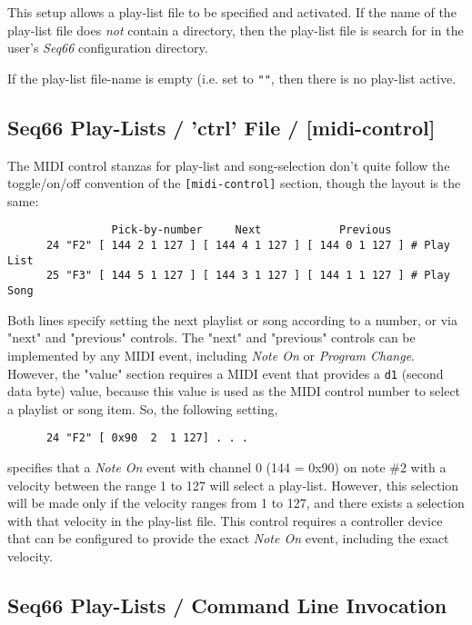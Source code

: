    This setup allows a play-list file to be specified and activated.
   If the name of the play-list file does \textsl{not} contain a directory,
   then the play-list file is search for in the user's \textsl{Seq66}
   configuration directory.

   If the play-list file-name is empty (i.e. set to \texttt{""}, then there is
   no play-list active.

\subsection{Seq66 Play-Lists / 'ctrl' File / [midi-control]}
\label{subsec:playlist_rc_file_midi_ctrl}

   The MIDI control stanzas for play-list and song-selection don't quite follow
   the toggle/on/off convention of the \texttt{[midi-control]} section, though
   the layout is the same:

   \begin{verbatim}
                Pick-by-number     Next            Previous
      24 "F2" [ 144 2 1 127 ] [ 144 4 1 127 ] [ 144 0 1 127 ] # Play List
      25 "F3" [ 144 5 1 127 ] [ 144 3 1 127 ] [ 144 1 1 127 ] # Play Song
   \end{verbatim}

   Both lines specify setting the next playlist or song according to a number,
   or via "next" and "previous" controls.  The "next" and "previous" controls
   can be implemented by any MIDI event, including \textsl{Note On} or
   \textsl{Program Change}.  However, the "value" section requires a MIDI event
   that provides a \texttt{d1} (second data byte) value, because this value is
   used as the MIDI control number to select a playlist or song item.
   So, the following setting,

   \begin{verbatim}
      24 "F2" [ 0x90  2  1 127] . . .
   \end{verbatim}

   specifies that a \textsl{Note On} event with channel 0 (144 = 0x90) on note
   \#2 with a velocity between the range 1 to 127 will select a play-list.
   However, this selection will be made only if the velocity ranges from 1 to
   127, and there exists a selection with that velocity in the play-list file.
   This control requires a controller device that can be configured to provide
   the exact \textsl{Note On} event, including the exact velocity.

\subsection{Seq66 Play-Lists / Command Line Invocation}
\label{subsec:playlist_cmd_line}

